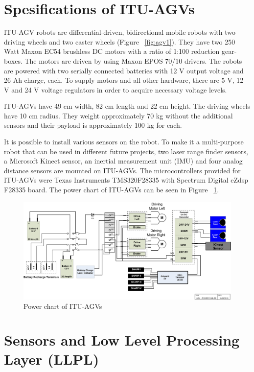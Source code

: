 \section{Spesifications of ITU-AGVs}
\label{sec:specs of agvs}
ITU-AGV robots are differential-driven, bidirectional mobile robots with two driving wheels and two caster wheels (Figure ~\ref{fig:agv1}). They have two 250 Watt Maxon EC54 brushless DC motors with a ratio of 1:100 reduction gear-boxes. The motors are driven by using Maxon EPOS 70/10 drivers. The robots are powered with two serially connected batteries with 12 V output voltage and 26 Ah charge, each. To supply motors and all other hardware, there are 5 V, 12 V and 24 V voltage regulators in order to acquire necessary voltage levels. 
\par
ITU-AGVs have 49 cm width, 82 cm length and 22 cm height. The driving wheels have 10 cm radius. They weight approximately 70 kg without the additional sensors and their payload is approximately 100 kg for each. 
\par
It is possible to install various sensors on the robot. To make it a multi-purpose robot that can be used in different future projects, two laser range finder sensors, a Microsoft Kinect sensor, an inertial measurement unit (IMU) and four analog distance sensors are mounted on ITU-AGVs. The microcontrollers provided for ITU-AGVs were Texas Instruments TMS320F28335 with Spectrum Digital eZdsp F28335 board. 
The power chart of ITU-AGVs can be seen in Figure ~\ref{fig:agvPower}.

\begin{figure}
	\centering
	\includegraphics[scale=0.42]{images/img2-agvPower}
	\caption{Power chart of ITU-AGVs}
	\label{fig:agvPower}
\end{figure}

\section{Sensors and Low Level Processing Layer (LLPL)}
\label{sec:sensors and llpl}


